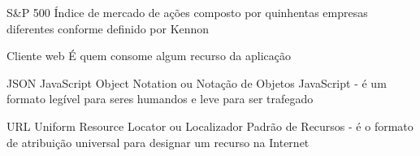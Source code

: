 \begin{siglas}
    \item[S\&P 500] Índice de mercado de ações composto por
                    quinhentas empresas diferentes conforme definido
                    por Kennon \cite{definicao-de-sp500}

    \item[Cliente web] É quem consome algum recurso da aplicação

    \item[JSON] JavaScript Object Notation ou Notação de Objetos JavaScript -
                é um formato legível para seres humandos e leve para ser trafegado \cite{define-json}

    \item[URL] Uniform Resource Locator ou Localizador Padrão de Recursos -
               é o formato de atribuição universal para designar um recurso na Internet
\end{siglas}
